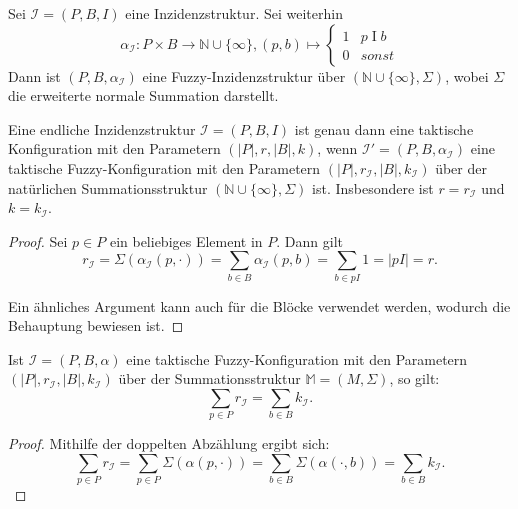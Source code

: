 \documentclass{article}
\begin{document}
\begin{definition}
  Sei $\mathcal{I} = (P, B, I)$ eine Inzidenzstruktur.
  Sei weiterhin
  \begin{equation*}
    \alpha_{\mathcal{I}} \colon P \times B \to \mathbb{N} \cup \{\infty\}, (p, b) \mapsto
    \begin{cases}
      1 & p \mathrel{I} b \\
      0 & sonst
    \end{cases}
  \end{equation*}
  Dann ist $(P, B, \alpha_{\mathcal{I}})$ eine Fuzzy-Inzidenzstruktur über $(\mathbb{N} \cup \{\infty\}, \Sigma)$,
  wobei $\Sigma$ die erweiterte normale Summation darstellt.
\end{definition}

\begin{theorem}
  Eine endliche Inzidenzstruktur $\mathcal{I} = (P, B, I)$ ist genau dann eine taktische Konfiguration mit den Parametern $(|P|, r, |B|, k)$,
  wenn $\mathcal{I'} = (P, B, \alpha_{\mathcal{I}})$ eine taktische Fuzzy-Konfiguration mit den Parametern $(|P|, r_\mathcal{I}, |B|, k_\mathcal{I})$
  über der natürlichen Summationsstruktur $(\mathbb{N} \cup \{\infty\}, \Sigma)$ ist.
  Insbesondere ist $r = r_\mathcal {I}$ und $k = k_\mathcal{I}$.
\end{theorem}
\begin{proof}
  Sei $p \in P$ ein beliebiges Element in $P$.
  Dann gilt
  \begin{equation*}
    r_\mathcal{I} = \Sigma(\alpha_\mathcal{I}(p, \cdot)) 
    = \sum_{b \in B}\alpha_\mathcal{I}(p, b)
    = \sum_{b \in pI}1 = |pI| = r.
  \end{equation*}

  Ein ähnliches Argument kann auch für die Blöcke verwendet werden, wodurch die Behauptung bewiesen ist.
\end{proof}

\begin{theorem}
  Ist $\mathcal{I} = (P, B, \alpha)$ eine taktische Fuzzy-Konfiguration mit den Parametern $(|P|, r_\mathcal{I}, |B|, k_\mathcal{I})$ über der Summationsstruktur $\mathbb{M} = (M, \Sigma)$, so gilt:
  \begin{equation*}
    \sum_{p \in P}r_\mathcal{I} = \sum_{b \in B}k_\mathcal{I}.
  \end{equation*}
\end{theorem}
\begin{proof}
  Mithilfe der doppelten Abzählung ergibt sich:
  \begin{equation*}
    \sum_{p \in P}r_\mathcal{I} = \sum_{p \in P}\Sigma(\alpha(p, \cdot)) = \sum_{b \in B}\Sigma(\alpha(\cdot, b)) = \sum_{b \in B}k_\mathcal{I}.
  \end{equation*}  
\end{proof}
\end{document}
